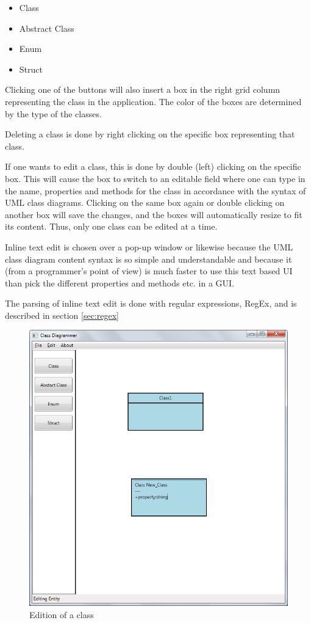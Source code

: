 \begin{itemize}
  \item Class
  \item Abstract Class
  \item Enum
  \item Struct
\end{itemize}

Clicking one of the buttons will also insert a box in the right grid column representing the class in the application. The color of the boxes are determined by the type of the classes.

Deleting a class is done by right clicking on the specific box representing that class.

If one wants to edit a class, this is done by double (left) clicking on the specific box. This will cause the box to switch to an editable field where one can type in the name, properties and methods for the class in accordance with the syntax of UML class diagrams. Clicking on the same box again or double clicking on another box will save the changes, and the boxes will automatically resize to fit its content. Thus, only one class can be edited at a time.

Inline text edit is chosen over a pop-up window or likewise because the UML class diagram content syntax is so simple and understandable and because it (from a programmer's point of view) is much faster to use this text based UI than pick the different properties and methods etc. in a GUI.

The parsing of inline text edit is done with regular expressions, RegEx, and is described in section \ref{sec:regex}

\begin{figure}[htbp]
   \centering
   \includegraphics[width=1\linewidth]{figure/edit_text}
   \caption{Edition of a class}
   \label{fig:edit}
\end{figure}

